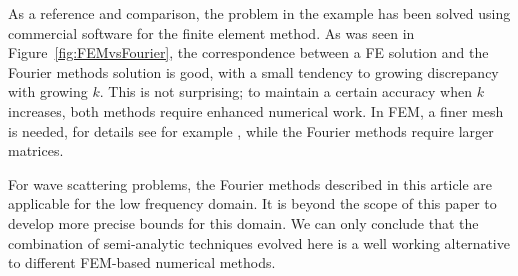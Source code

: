 \documentclass[numreferences]{kluwer}
\begin{document}
As a reference and comparison, the problem in the example has been
solved using commercial software for the finite element method.
As was seen in Figure~\ref{fig:FEMvsFourier}, the
correspondence between a FE solution and the Fourier methods solution
is good, with a small tendency to growing discrepancy with growing
$k$. This is not surprising; to maintain a certain accuracy when $k$
increases, both methods require enhanced numerical work. In FEM, a
finer mesh is needed, for details see for example
\cite{Ihlenburg:1998}, while the Fourier methods require larger
matrices.

For wave scattering problems, the Fourier methods described in this
article are applicable for the low frequency domain.
It is beyond the scope of this paper to develop more precise bounds
for this domain. We can only conclude that the combination of
semi-analytic techniques evolved here is a well working
alternative to different FEM-based numerical methods.



\end{document}
